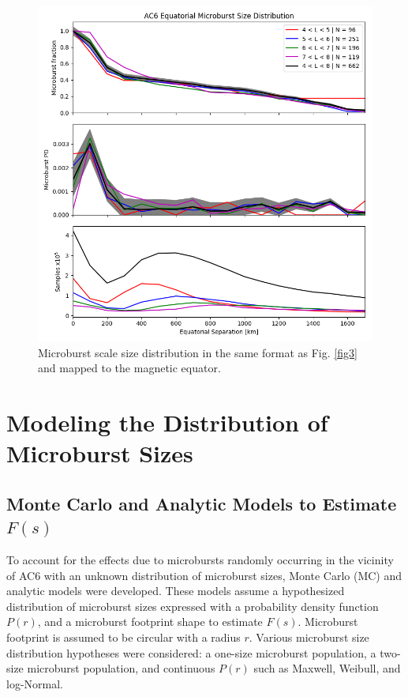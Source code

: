 \documentclass[draft]{agujournal2019}
\begin{document}
\begin{figure}
\includegraphics[width=\textwidth]{fig4.png}
\caption{Microburst scale size distribution in the same format as Fig. \ref{fig3} and mapped to the magnetic equator.} 
\label{fig4}
\end{figure}

\section{Modeling the Distribution of Microburst Sizes} \label{model_section}
\subsection{Monte Carlo and Analytic Models to Estimate $F(s)$}
To account for the effects due to microbursts randomly occurring in the vicinity of AC6 with an unknown distribution of microburst sizes, Monte Carlo (MC) and analytic models were developed. These models assume a hypothesized distribution of microburst sizes expressed with a probability density function $P(r)$, and a microburst footprint shape to estimate $F(s)$. Microburst footprint is assumed to be circular with a radius $r$. Various microburst size distribution hypotheses were considered: a one-size microburst population, a two-size microburst population, and continuous $P(r)$ such as Maxwell, Weibull, and log-Normal.
\end{document}
